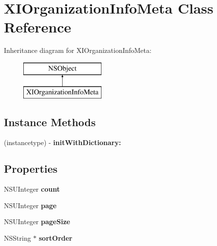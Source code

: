 \hypertarget{interface_x_i_organization_info_meta}{}\section{X\+I\+Organization\+Info\+Meta Class Reference}
\label{interface_x_i_organization_info_meta}
Inheritance diagram for X\+I\+Organization\+Info\+Meta\+:\begin{figure}[H]
\begin{center}
\leavevmode
\includegraphics[height=2.000000cm]{interface_x_i_organization_info_meta}
\end{center}
\end{figure}
\subsection*{Instance Methods}
\begin{DoxyCompactItemize}
\item 
\hypertarget{interface_x_i_organization_info_meta_a1949590810dc7b3ebd35c21e4ddbf393}{}\label{interface_x_i_organization_info_meta_a1949590810dc7b3ebd35c21e4ddbf393} 
(instancetype) -\/ {\bfseries init\+With\+Dictionary\+:}
\end{DoxyCompactItemize}
\subsection*{Properties}
\begin{DoxyCompactItemize}
\item 
\hypertarget{interface_x_i_organization_info_meta_ae246e6ff48e38e28df3db714f516f50b}{}\label{interface_x_i_organization_info_meta_ae246e6ff48e38e28df3db714f516f50b} 
N\+S\+U\+Integer {\bfseries count}
\item 
\hypertarget{interface_x_i_organization_info_meta_a0ee20239307f9a9c78b45f182462321d}{}\label{interface_x_i_organization_info_meta_a0ee20239307f9a9c78b45f182462321d} 
N\+S\+U\+Integer {\bfseries page}
\item 
\hypertarget{interface_x_i_organization_info_meta_aadf20060cccccc06f5db831c01891f75}{}\label{interface_x_i_organization_info_meta_aadf20060cccccc06f5db831c01891f75} 
N\+S\+U\+Integer {\bfseries page\+Size}
\item 
\hypertarget{interface_x_i_organization_info_meta_a5affd824753994109499616e8d1c505c}{}\label{interface_x_i_organization_info_meta_a5affd824753994109499616e8d1c505c} 
N\+S\+String $\ast$ {\bfseries sort\+Order}
\end{DoxyCompactItemize}


